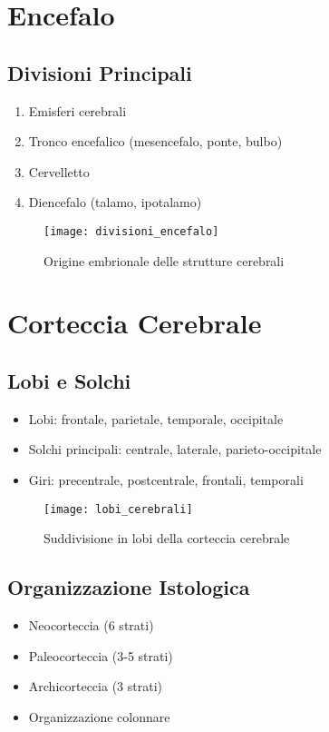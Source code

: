 \documentclass[12pt]{article}
\begin{document}
\section{Encefalo}
\subsection{Divisioni Principali}
\begin{enumerate}
    \item Emisferi cerebrali
    \item Tronco encefalico (mesencefalo, ponte, bulbo)
    \item Cervelletto
    \item Diencefalo (talamo, ipotalamo)
\end{enumerate}

\begin{figure}[h]
    \centering
    \texttt{[image: divisioni\_encefalo]}
    \caption{Origine embrionale delle strutture cerebrali}
\end{figure}

\section{Corteccia Cerebrale}
\subsection{Lobi e Solchi}
\begin{itemize}
    \item Lobi: frontale, parietale, temporale, occipitale
    \item Solchi principali: centrale, laterale, parieto-occipitale
    \item Giri: precentrale, postcentrale, frontali, temporali
\end{itemize}

\begin{figure}[h]
    \centering
    \texttt{[image: lobi\_cerebrali]}
    \caption{Suddivisione in lobi della corteccia cerebrale}
\end{figure}

\subsection{Organizzazione Istologica}
\begin{itemize}
    \item Neocorteccia (6 strati)
    \item Paleocorteccia (3-5 strati)
    \item Archicorteccia (3 strati)
    \item Organizzazione colonnare
\end{itemize}
\end{document}
